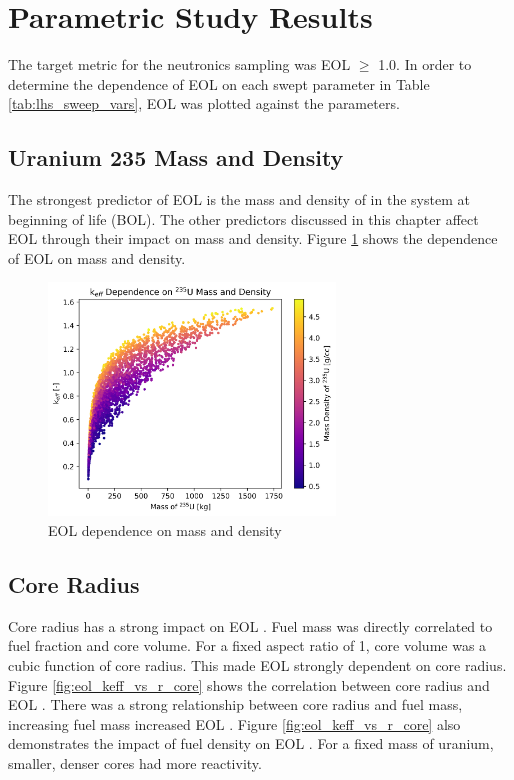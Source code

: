 \section{Parametric Study Results}
The target metric for the neutronics sampling was EOL \keff $\geq$ 1.0. In
order to determine the dependence of EOL \keff on each swept parameter in Table
\ref{tab:lhs_sweep_vars}, EOL \keff was plotted against the parameters.

\subsection{Uranium 235 Mass and Density}
The strongest predictor of EOL \keff is the mass and density of \uran
in the system at beginning of life (BOL). The other predictors discussed 
in this chapter affect EOL \keff
through their impact on \uran mass and density. Figure \ref{fig:eol_keff_vs_235_mass} 
shows the dependence of EOL \keff on \uran mass and density.

\begin{figure}[h]
    \centering
    \includegraphics[width=3in]{../images/keff_vs_mass_235_mdens_235.png}
\caption{EOL \keff dependence on \uran mass and density}
\label{fig:eol_keff_vs_235_mass}
\end{figure}

\subsection{Core Radius}
Core radius has a strong impact on EOL \keff. Fuel mass was directly correlated
to fuel fraction and core volume. For a fixed aspect ratio of 1, core volume was
a cubic function of core radius. This made EOL \keff strongly dependent on core
radius. Figure \ref{fig:eol_keff_vs_r_core} shows the correlation between 
core radius and EOL \keff. There was a strong relationship between core radius
and fuel mass, increasing fuel mass increased EOL \keff. Figure
\ref{fig:eol_keff_vs_r_core} also demonstrates the impact of fuel density on EOL
\keff. For a fixed mass of uranium, smaller, denser cores had more reactivity.

